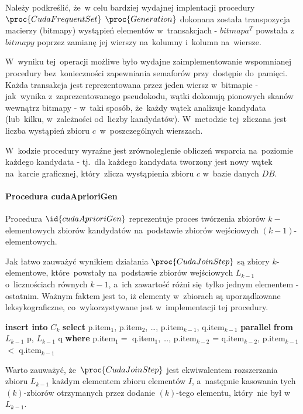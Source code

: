 Należy podkreślić, że~w celu bardziej wydajnej implentacji procedury $\proc{Cuda Frequent Set}$ $\proc{Generation}$ dokonana została transpozycja macierzy (bitmapy) wystąpień elementów w~transakcjach - $bitmapa^T$ powstała z~$bitmapy$ poprzez zamianę jej wierszy na~kolumny i~kolumn na~wiersze. 

W~wyniku tej~operacji możliwe było wydajne zaimplementowanie wspomnianej procedury bez~konieczności zapewniania semaforów przy~dostępie do~pamięci. Każda transakcja jest reprezentowana przez jeden wiersz w~bitmapie - jak~wynika z~zaprezentowanego pseudokodu, wątki dokonują pionowych skanów wewnątrz bitmapy - w~taki sposób, że~każdy wątek analizuje kandydata (lub~kilku, w~zależności od~liczby kandydatów). W~metodzie tej~zliczana jest liczba wystąpień zbioru $c$~w~poszczególnych wierszach.

W~kodzie procedury  wyraźne jest zrównoleglenie obliczeń wsparcia na~poziomie każdego kandydata - tj.~dla każdego kandydata tworzony jest nowy wątek na~karcie graficznej, który~zlicza wystąpienia zbioru $c$ w~bazie danych $DB$.

\paragraph{Procedura cudaAprioriGen\label{sec:cudaAprioriGen}}
Procedura $\id{cudaAprioriGen}$ reprezentuje proces twórzenia zbiorów $k-$ elementowych zbiorów kandydatów na~podstawie zbiorów wejściowych $(k-1)$-elementowych.

Jak łatwo zauważyć wynikiem działania $\proc{Cuda Join Step}$ są zbiory $k$-elementowe, które~powstały na~podstawie zbiorów wejściowych $L_{k-1}$ o~licznościach równych $k-1$, a~ich zawartość różni się~tylko jednym elementem - ostatnim. Ważnym faktem jest to, iż elementy w~zbiorach są uporządkowane leksykograficzne, co~wykorzystywane jest w~implementacji tej procedury.

\begin{codebox}
	\li \textbf{insert into} $C_k$
	\li \textbf{select} p.item$_1$, p.item$_2$, \dots, p.item$_{k-1}$, q.item$_{k-1}$ \textbf{parallel}
	\li \textbf{from} $L_{k-1}$ p, $L_{k-1}$ q
	\li \textbf{where} p.item$_1 = $ q.item$_1$, \dots, p.item$_{k-2}$ = q.item$_{k-2}$, p.item$_{k-1}$ $<$ q.item$_{k-1}$
\end{codebox}

Warto zauważyć, że~$\proc{Cuda Join Step}$ jest ekwiwalentem rozszerzania zbioru $L_{k-1}$ każdym elementem zbioru elementów $I$, a~następnie kasowania tych $(k)$-zbiorów otrzymanych przez dodanie $(k)$-tego elementu, który~nie był w~$L_{k-1}$. 

